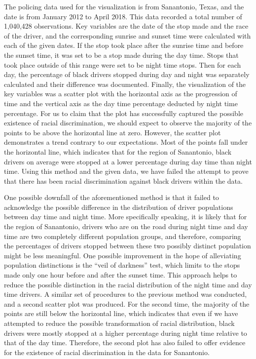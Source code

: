 \documentclass[
]{book}
\begin{document}
The policing data used for the visualization is from Sanantonio, Texas, and the date is from January 2012 to April 2018. This data recorded a total number of 1,040,428 observations. Key variables are the date of the stop made and the race of the driver, and the corresponding sunrise and sunset time were calculated with each of the given dates. If the stop took place after the sunrise time and before the sunset time, it was set to be a stop made during the day time. Stops that took place outside of this range were set to be night time stops. Then for each day, the percentage of black drivers stopped during day and night was separately calculated and their difference was documented. Finally, the visualization of the key variables was a scatter plot with the horizontal axis as the progression of time and the vertical axis as the day time percentage deducted by night time percentage. For us to claim that the plot has successfully captured the possible existence of racial discrimination, we should expect to observe the majority of the points to be above the horizontal line at zero. However, the scatter plot demonstrates a trend contrary to our expectations. Most of the points fall under the horizontal line, which indicates that for the region of Sanantonio, black drivers on average were stopped at a lower percentage during day time than night time. Using this method and the given data, we have failed the attempt to prove that there has been racial discrimination against black drivers within the data.

One possible downfall of the aforementioned method is that it failed to acknowledge the possible difference in the distribution of driver populations between day time and night time. More specifically speaking, it is likely that for the region of Sanantonio, drivers who are on the road during night time and day time are two completely different population groups, and therefore, comparing the percentages of drivers stopped between these two possibly distinct population might be less meaningful. One possible improvement in the hope of alleviating population distinctions is the ``veil of darkness'' test, which limits to the stops made only one hour before and after the sunset time. This approach helps to reduce the possible distinction in the racial distribution of the night time and day time drivers. A similar set of procedures to the previous method was conducted, and a second scatter plot was produced. For the second time, the majority of the points are still below the horizontal line, which indicates that even if we have attempted to reduce the possible transformation of racial distribution, black drivers were mostly stopped at a higher percentage during night time relative to that of the day time. Therefore, the second plot has also failed to offer evidence for the existence of racial discrimination in the data for Sanantonio.
\end{document}
